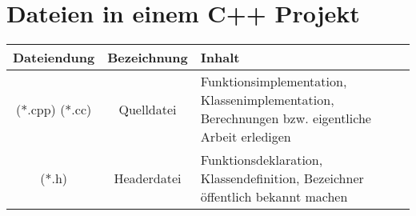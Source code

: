 \documentclass[a4paper]{report}
\theoremstyle{nonumberplain}
\begin{document}
\section{Dateien in einem C++ Projekt}

\begin{center}
\begin{tabular}{|c|c|p{10cm}|}
	\hline
	Dateiendung & Bezeichnung & Inhalt \\
	\hline
	(*.cpp) (*.cc) & Quelldatei & Funktionsimplementation, Klassenimplementation, \newline Berechnungen bzw. eigentliche Arbeit erledigen \\ \hline
	(*.h) & Headerdatei & Funktionsdeklaration, Klassendefinition, \newline Bezeichner öffentlich bekannt machen \\
	\hline
	
\end{tabular}
\end{center}

\end{document}
